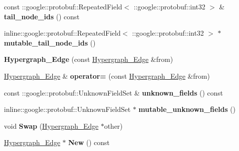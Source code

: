 \begin{DoxyCompactItemize}
\item 
\hypertarget{classHypergraph__Edge_a28559493dc288cd24e970ab2ff43906a}{
const ::google::protobuf::RepeatedField$<$ ::google::protobuf::int32 $>$ \& {\bfseries tail\_\-node\_\-ids} () const }
\label{classHypergraph__Edge_a28559493dc288cd24e970ab2ff43906a}

\item 
\hypertarget{classHypergraph__Edge_a80b009f10f4dd634d437ae740ed6971d}{
inline::google::protobuf::RepeatedField$<$ ::google::protobuf::int32 $>$ $\ast$ {\bfseries mutable\_\-tail\_\-node\_\-ids} ()}
\label{classHypergraph__Edge_a80b009f10f4dd634d437ae740ed6971d}

\item 
\hypertarget{classHypergraph__Edge_ab108838f9bbf8f03991f762393082d85}{
{\bfseries Hypergraph\_\-Edge} (const \hyperlink{classHypergraph__Edge}{Hypergraph\_\-Edge} \&from)}
\label{classHypergraph__Edge_ab108838f9bbf8f03991f762393082d85}

\item 
\hypertarget{classHypergraph__Edge_a16e449f104fcdc9762db9654f7b4ccc2}{
\hyperlink{classHypergraph__Edge}{Hypergraph\_\-Edge} \& {\bfseries operator=} (const \hyperlink{classHypergraph__Edge}{Hypergraph\_\-Edge} \&from)}
\label{classHypergraph__Edge_a16e449f104fcdc9762db9654f7b4ccc2}

\item 
\hypertarget{classHypergraph__Edge_a423eb7f720ca17f4d8f061cdeb4bff1f}{
const ::google::protobuf::UnknownFieldSet \& {\bfseries unknown\_\-fields} () const }
\label{classHypergraph__Edge_a423eb7f720ca17f4d8f061cdeb4bff1f}

\item 
\hypertarget{classHypergraph__Edge_ab421c0d9bbba2cb1f190e7f2c9e13390}{
inline::google::protobuf::UnknownFieldSet $\ast$ {\bfseries mutable\_\-unknown\_\-fields} ()}
\label{classHypergraph__Edge_ab421c0d9bbba2cb1f190e7f2c9e13390}

\item 
\hypertarget{classHypergraph__Edge_a6042bf2bb2b6a7446926d17ea1b8fe1f}{
void {\bfseries Swap} (\hyperlink{classHypergraph__Edge}{Hypergraph\_\-Edge} $\ast$other)}
\label{classHypergraph__Edge_a6042bf2bb2b6a7446926d17ea1b8fe1f}

\item 
\hypertarget{classHypergraph__Edge_a262998f991bd7d5e69fe7b249995e321}{
\hyperlink{classHypergraph__Edge}{Hypergraph\_\-Edge} $\ast$ {\bfseries New} () const }
\label{classHypergraph__Edge_a262998f991bd7d5e69fe7b249995e321}


\end{DoxyCompactItemize}
